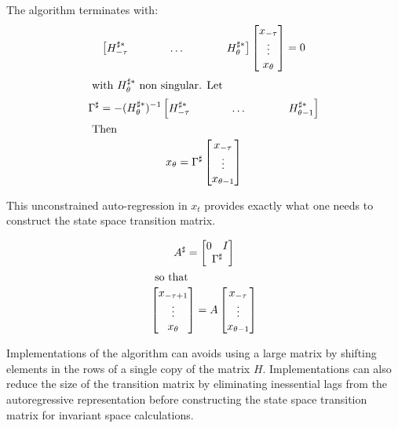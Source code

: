 \documentclass[12pt]{article}
\begin{document}
The algorithm terminates with:
\begin{gather}\label{eq:easy}
  \begin{bmatrix}
    \hsh
  \end{bmatrix} 
  \begin{bmatrix}
    x_{-\tau}\\ \vdots \\x_{\theta}
  \end{bmatrix} =0%
   \\ \intertext{ with $H^{\sharp\ast}_{\theta}$ non singular. Let} 
\Gamma^\sharp=-  (H^{\sharp\ast}_{\theta})^{-1}\begin{bmatrix}
    \hshShort
  \end{bmatrix} \\ \intertext{ Then }
x_{\theta} = 
 \Gamma^\sharp
  \begin{bmatrix}
    x_{-\tau}\\ \vdots \\x_{\theta-1}
  \end{bmatrix}  %
\end{gather}

This unconstrained auto-regression in $x_t$ provides exactly what one needs to
construct the state space transition matrix. 



\begin{gather}
A^\sharp= 
\begin{bmatrix}
  \begin{matrix}
    0&I
  \end{matrix}\\ \Gamma^\sharp
\end{bmatrix}\\ \intertext{ so that }
  \begin{bmatrix}
    x_{-\tau+1}\\ \vdots \\x_{\theta}
  \end{bmatrix}  = A
  \begin{bmatrix}
    x_{-\tau}\\ \vdots \\x_{\theta-1}
  \end{bmatrix} 
\end{gather}

Implementations of the algorithm can  avoids using a large matrix by
shifting  elements in the
rows of a single copy of the matrix $H$. 
Implementations can also reduce the size of the transition matrix by
eliminating  inessential lags from the autoregressive representation before
constructing the state space transition matrix for invariant space 
calculations.  
\end{document}
